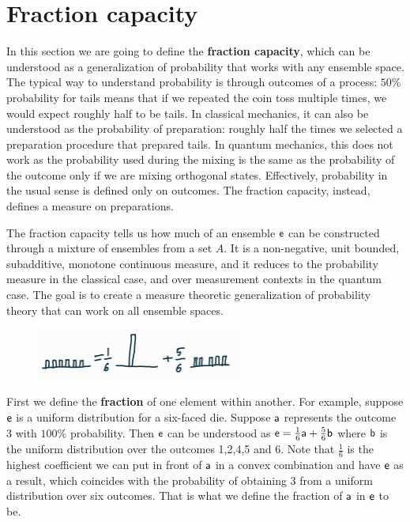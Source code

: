 \section{Fraction capacity}

In this section we are going to define the \textbf{fraction capacity}, which can be understood as a generalization of probability that works with any ensemble space. The typical way to understand probability is through outcomes of a process: $50\%$ probability for tails means that if we repeated the coin toss multiple times, we would expect roughly half to be tails. In classical mechanics, it can also be understood as the probability of preparation: roughly half the times we selected a preparation procedure that prepared tails. In quantum mechanics, this does not work as the probability used during the mixing is the same as the probability of the outcome only if we are mixing orthogonal states. Effectively, probability in the usual sense is defined only on outcomes. The fraction capacity, instead, defines a measure on preparations.

The fraction capacity tells us how much of an ensemble $\ens$ can be constructed through a mixture of ensembles from a set $A$. It is a non-negative, unit bounded, subadditive, monotone continuous measure, and it reduces to the probability measure in the classical case, and over measurement contexts in the quantum case. The goal is to create a measure theoretic generalization of probability theory that can work on all ensemble spaces.

\begin{figure}[h]
	\centering
	\includegraphics[width=0.6\textwidth]{tempimages/Fraction.jpg}
\end{figure}

First we define the \textbf{fraction} of one element within another. For example, suppose $\ens$ is a uniform distribution for a six-faced die. Suppose $\ens[a]$ represents the outcome 3 with $100\%$ probability. Then $\ens$ can be understood as $\ens = \frac{1}{6} \ens[a] + \frac{5}{6} \ens[b]$ where $\ens[b]$ is the uniform distribution over the outcomes 1,2,4,5 and 6. Note that $\frac{1}{6}$ is the highest coefficient we can put in front of $\ens[a]$ in a convex combination and have $\ens$ as a result, which coincides with the probability of obtaining 3 from a uniform distribution over six outcomes. That is what we define the fraction of $\ens[a]$ in $\ens$ to be.

